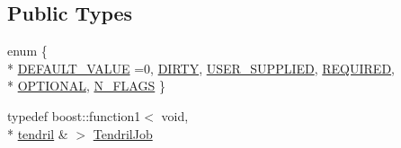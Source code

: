 \subsection*{Public Types}
\begin{DoxyCompactItemize}
\item 
enum \{ \\*
\hyperlink{classecto_1_1tendril_ab63b76909681783917fcb55e3c89f4aca122dd16c5a22a6e22c7caedf7be1d92f}{D\-E\-F\-A\-U\-L\-T\-\_\-\-V\-A\-L\-U\-E} =0, 
\hyperlink{classecto_1_1tendril_ab63b76909681783917fcb55e3c89f4aca7ae45e8526726df642f14c19db78564d}{D\-I\-R\-T\-Y}, 
\hyperlink{classecto_1_1tendril_ab63b76909681783917fcb55e3c89f4aca26dbd8778d8007b845bb247f6ce87ff8}{U\-S\-E\-R\-\_\-\-S\-U\-P\-P\-L\-I\-E\-D}, 
\hyperlink{classecto_1_1tendril_ab63b76909681783917fcb55e3c89f4acac686a7ccc1227f1ae09d79536683136b}{R\-E\-Q\-U\-I\-R\-E\-D}, 
\\*
\hyperlink{classecto_1_1tendril_ab63b76909681783917fcb55e3c89f4aca4906c6f7c63b6934ea683ea05716abee}{O\-P\-T\-I\-O\-N\-A\-L}, 
\hyperlink{classecto_1_1tendril_ab63b76909681783917fcb55e3c89f4aca8748e76437a722b0cfb3652fefd47d67}{N\-\_\-\-F\-L\-A\-G\-S}
 \}
\item 
typedef boost\-::function1$<$ void, \\*
\hyperlink{classecto_1_1tendril}{tendril} \& $>$ \hyperlink{classecto_1_1tendril_ad312bffc767516bd2340d02cd9e218ae}{Tendril\-Job}
\end{DoxyCompactItemize}
